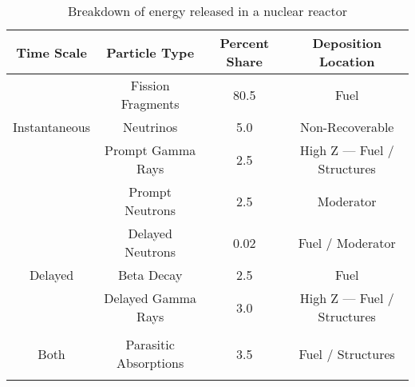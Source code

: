\documentclass{article}
\begin{document}
\begin{table}[]
    \centering
    \def\arraystretch{1.5}
    \caption{Breakdown of energy released in a nuclear reactor}
    \begin{tabular}{|c|c|c|c|}
        \hline
        Time Scale & Particle Type & Percent Share & Deposition Location\\
        \midrule
        \hline
        & Fission Fragments & 80.5 & Fuel\\
        Instantaneous & Neutrinos & 5.0 & Non-Recoverable \\
        & Prompt Gamma Rays & 2.5 &  High Z --- Fuel / Structures\\
        & Prompt Neutrons & 2.5 & Moderator\\
        \midrule
        \hline
        & Delayed Neutrons & 0.02 & Fuel / Moderator\\
        Delayed & Beta Decay & 2.5  & Fuel\\
        & Delayed Gamma Rays & 3.0 & High Z --- Fuel / Structures\\
        \midrule
        \hline
        &&&\\
        Both & Parasitic Absorptions & 3.5 & Fuel / Structures\\
        &&&\\
        \hline
    \end{tabular}
    \label{tab:breakdown}
\end{table}
\end{document}
